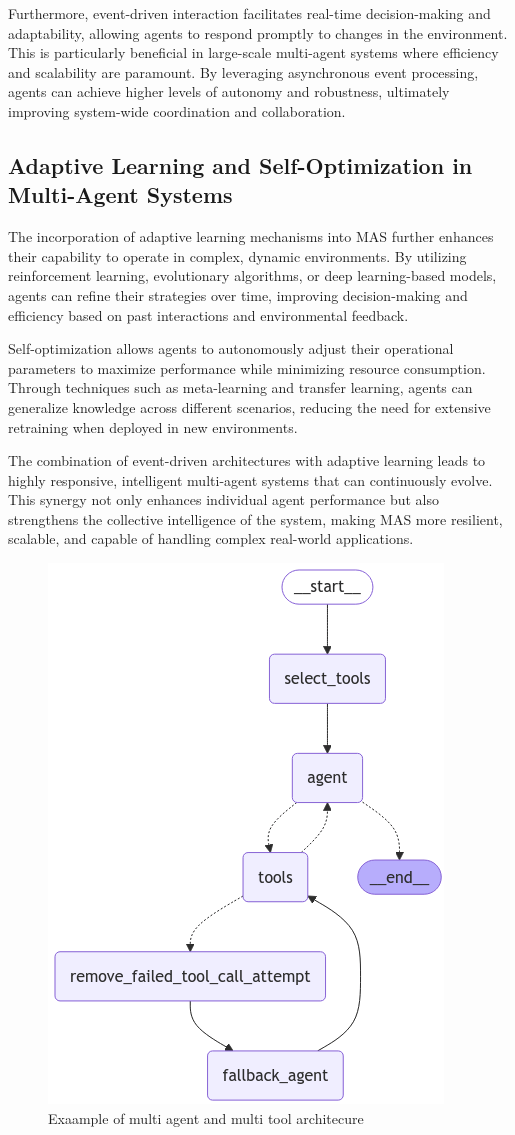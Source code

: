 Furthermore, event-driven interaction facilitates real-time decision-making and adaptability, allowing agents to respond promptly to changes in the environment. This is particularly beneficial in large-scale multi-agent systems where efficiency and scalability are paramount. By leveraging asynchronous event processing, agents can achieve higher levels of autonomy and robustness, ultimately improving system-wide coordination and collaboration.

\subsection{Adaptive Learning and Self-Optimization in Multi-Agent Systems}

The incorporation of adaptive learning mechanisms into MAS further enhances their capability to operate in complex, dynamic environments. By utilizing reinforcement learning, evolutionary algorithms, or deep learning-based models, agents can refine their strategies over time, improving decision-making and efficiency based on past interactions and environmental feedback.

Self-optimization allows agents to autonomously adjust their operational parameters to maximize performance while minimizing resource consumption. Through techniques such as meta-learning and transfer learning, agents can generalize knowledge across different scenarios, reducing the need for extensive retraining when deployed in new environments.

The combination of event-driven architectures with adaptive learning leads to highly responsive, intelligent multi-agent systems that can continuously evolve. This synergy not only enhances individual agent performance but also strengthens the collective intelligence of the system, making MAS more resilient, scalable, and capable of handling complex real-world applications.

\begin{figure}[H]
    \centering
    \includegraphics[width=0.5\linewidth]{Assets/complex_agent.png}
    \caption{Exaample of multi agent and multi tool architecure}
    \label{fig:enter-label}
\end{figure}

